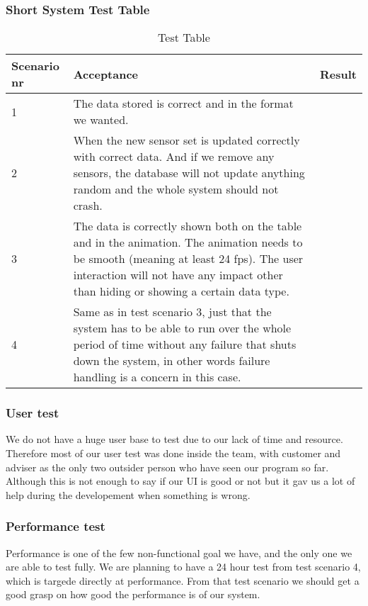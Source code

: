\documentclass[../document]{subfiles}
\begin{document}
\subsubsection{Short System Test Table}
\begin{table}[H]
\caption{Test Table}
\centering
\begin{tabularx}{\textwidth}{|l|X|X|}
	\hline
	Scenario nr
	&Acceptance
	&Result
	\\ \hline 1
	&The data stored is correct and in the format we wanted.
	&
	\\ \hline 2
	&When the new sensor set is updated correctly with correct data. And if we remove any sensors, the database will not update anything random and the whole system should not crash.
	&
	\\ \hline 3
	&The data is correctly shown both on the table and in the animation. The animation needs to be smooth (meaning at least 24 fps). The user interaction will not have any impact other than hiding or showing a certain data type.
	&
	\\ \hline 4
	&Same as in test scenario 3, just that the system has to be able to run over the whole period of time without any failure that shuts down the system, in other words failure handling is a concern in this case.
	&
	\\ \hline 
\end{tabularx}
\end{table}

\subsubsection{User test}
We do not have a huge user base to test due to our lack of time and resource. Therefore most of our user test was done inside the team, with customer and adviser as the only two outsider person who have seen our program so far. Although this is not enough to say if our UI is good or not but it gav us a lot of help during the developement when something is wrong.


\subsubsection{Performance test}
Performance is one of the few non-functional goal we have, and the only one we are able to test fully. We are planning to have a 24 hour test from test scenario 4, which is targede directly at performance. From that test scenario we should get a good grasp on how good the performance is of our system.
\end{document}
